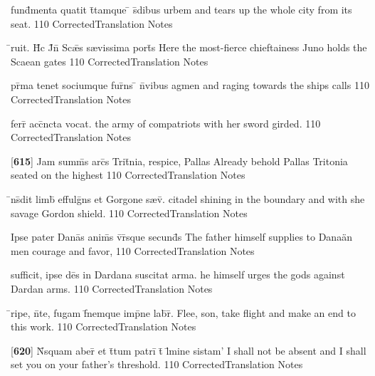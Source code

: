 \latline
  {fund\={}menta quatit t\={}tamque \={} s\={}dibus urbem}
  { and tears up the whole city from its seat. }
  {110}
  { CorrectedTranslation }
  { Notes }


\latline
  {\={}ruit.  H\={\macron {\i}}c J\={}n\={} Sc{\ae}\={}s s{\ae}vissima port\={}s}
  { Here the most-fierce chieftainess Juno holds the Scaean gates }
  {110}
  { CorrectedTranslation }
  { Notes }


\latline
  {pr\={\macron {\i}}ma tenet sociumque fur\={}ns \={} n\={}vibus agmen}
  { and raging towards the ships calls }
  {110}
  { CorrectedTranslation }
  { Notes }


\latline
  {ferr\={} acc\={\macron {\i}}ncta vocat.}
  { the army of compatriots with her sword girded. }
  {110}
  { CorrectedTranslation }
  { Notes }


\latline
  {[\textbf{615}] Jam summ\={}s arc\={}s Trit\={}nia, respice, Pallas}
  { Already behold Pallas Tritonia seated on the highest }
  {110}
  { CorrectedTranslation }
  { Notes }


\latline
  {\={\macron {\i}}ns\={}dit limb\={} effulg\={}ns et Gorgone s{\ae}v\={}.}
  { citadel shining in the boundary and with she savage Gordon shield. }
  {110}
  { CorrectedTranslation }
  { Notes }


\latline
  {Ipse pater Dana\={\macron {\i}}s anim\={}s v\={\macron {\i}}r\={\macron {\i}}sque secund\={}s}
  { The father himself supplies to Dana\"an men courage and favor, }
  {110}
  { CorrectedTranslation }
  { Notes }


\latline
  {sufficit, ipse de\={}s in Dardana suscitat arma.}
  { he himself urges the gods against Dardan arms. }
  {110}
  { CorrectedTranslation }
  { Notes }


\latline
  {\={}ripe, n\={}te, fugam f\={\macron {\i}}nemque imp\={}ne lab\={}r\={\macron {\i}}.}
  { Flee, son, take flight and make an end to this work. }
  {110}
  { CorrectedTranslation }
  { Notes }


\latline
  {[\textbf{620}] N\={}squam aber\={} et t\={}tum patri\={} t\={} l\={\macron {\i}}mine sistam'}
  { I shall not be absent and I shall set you on your father's threshold. }
  {110}
  { CorrectedTranslation }
  { Notes }


